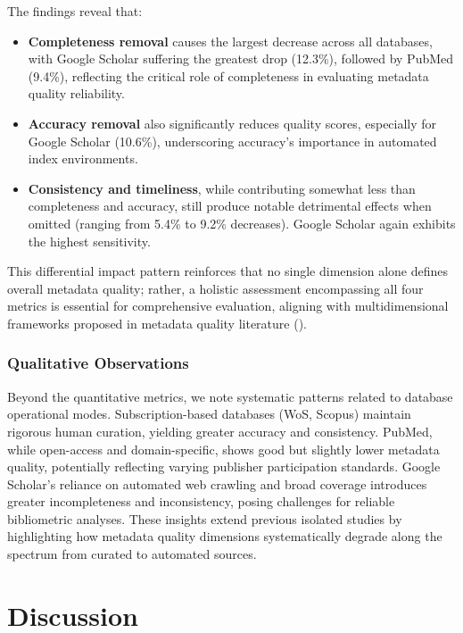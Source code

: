 \documentclass[
  12pt,
]{article}
\providecommand{\tightlist}{%
  \setlength{\itemsep}{0pt}\setlength{\parskip}{0pt}}
\begin{document}
The findings reveal that:

\begin{itemize}
\tightlist
\item
  \textbf{Completeness removal} causes the largest decrease across all
  databases, with Google Scholar suffering the greatest drop (12.3\%),
  followed by PubMed (9.4\%), reflecting the critical role of
  completeness in evaluating metadata quality reliability.
\item
  \textbf{Accuracy removal} also significantly reduces quality scores,
  especially for Google Scholar (10.6\%), underscoring accuracy's
  importance in automated index environments.
\item
  \textbf{Consistency and timeliness}, while contributing somewhat less
  than completeness and accuracy, still produce notable detrimental
  effects when omitted (ranging from 5.4\% to 9.2\% decreases). Google
  Scholar again exhibits the highest sensitivity.
\end{itemize}

This differential impact pattern reinforces that no single dimension
alone defines overall metadata quality; rather, a holistic assessment
encompassing all four metrics is essential for comprehensive evaluation,
aligning with multidimensional frameworks proposed in metadata quality
literature ().

\subsubsection{Qualitative Observations}\label{qualitative-observations}

Beyond the quantitative metrics, we note systematic patterns related to
database operational modes. Subscription-based databases (WoS, Scopus)
maintain rigorous human curation, yielding greater accuracy and
consistency. PubMed, while open-access and domain-specific, shows good
but slightly lower metadata quality, potentially reflecting varying
publisher participation standards. Google Scholar's reliance on
automated web crawling and broad coverage introduces greater
incompleteness and inconsistency, posing challenges for reliable
bibliometric analyses. These insights extend previous isolated studies
by highlighting how metadata quality dimensions systematically degrade
along the spectrum from curated to automated sources.

\section{Discussion}\label{discussion}
\end{document}
